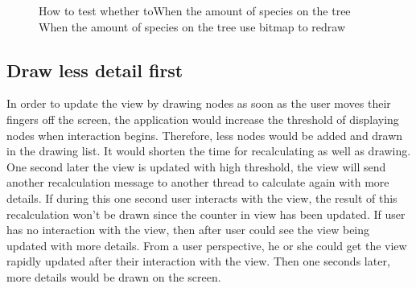 \documentclass[MSc]{icldt}
\begin{document}
\begin{figure}[H]
\caption{How to test whether toWhen the amount of species on the tree When the amount of species on the tree  use bitmap to redraw}
\end{figure}


\subsection{Draw less detail first}

In order to update the view by drawing nodes as soon as the user moves their fingers off the screen, the application would increase the threshold of displaying nodes when interaction begins. Therefore, less nodes would be added and drawn in the drawing list. It would shorten the time for recalculating as well as drawing. One second later the view is updated with high threshold, the view will send another recalculation message to another thread to calculate again with more details. If during this one second user interacts with the view, the result of this recalculation won't be drawn since the counter in view has been updated. If user has no interaction with the view, then after user could see the view being updated with more details. From a user perspective, he or she could get the view rapidly updated after their interaction with the view. Then one seconds later, more details would be drawn on the screen.
\end{document}
